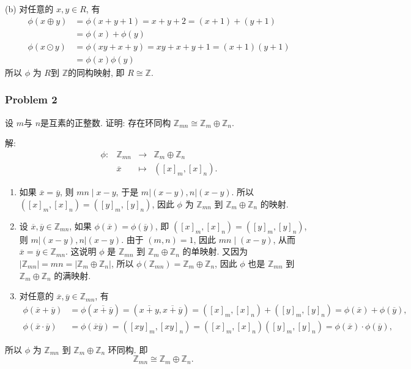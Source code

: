 \documentclass[a4paper,12pt]{ctexart}
\newcommand{\Z}{\mathbb{Z}}
\begin{document}
\begin{enumerate}[label=(\arabic{*})]
      (b) 对任意的 $x, y \in R$, 有
      $$
      \begin{aligned}
      \phi(x \oplus y) &=\phi(x+y+1)=x+y+2=(x+1)+(y+1) \\
      &=\phi(x)+\phi(y) \\
      \phi(x \odot y) &=\phi(x y+x+y)=x y+x+y+1=(x+1)(y+1) \\
      &=\phi(x) \phi(y)
      \end{aligned}
      $$
      所以 $ \phi $ 为 $ R $到 $ \Z $的同构映射, 即 $ R\cong \Z $.
    \end{enumerate}
    \subsubsection*{Problem 2} 
    设 $ m $与 $ n $是互素的正整数. 证明: 存在环同构 $ \Z_{mn}\cong \Z_m\oplus\Z_n $.
    
    解: 
    $$
    \begin{array}{crcl}
    \phi: & \Z_{m n} & \longrightarrow &\Z_m \oplus \Z_n \\
    &\overline{x} & \longmapsto&([x]_m, [x]_n) .
    \end{array}
    $$
    \begin{enumerate}[label=(\arabic{*})]
      \item 如果 $\overline{x}=\overline{y}$, 则 $m n \mid x-y$, 于是 $m|(x-y), n|(x-y)$. 所以 $([x]_m, [x]_n)=([y]_m, [y]_n)$, 因此 $\phi$ 为 $\Z_{m n}$ 到 $\Z_m \oplus \Z_n$ 的映射.
      \item 设 $\overline{x}, \overline{y} \in \Z_{m n}$, 如果 $\phi(\overline{x})=\phi(\overline{y})$, 即 $([x]_m, [x]_n)=([y]_m, [y]_n)$, 则 $m|(x-y), n|(x-y)$. 由于 $(m, n)=1$, 因此 $m n \mid(x-y)$, 从而 $\overline{x}=\overline{y} \in \Z_{m n}$. 这说明 $\phi$ 是 $\Z_{m n}$ 到 $\Z_m \oplus \Z_n$ 的单映射. 又因为 $\left|\Z_{m n}\right|=m n=\left|\Z_m \oplus \Z_n\right|$, 所以 $\phi\left(\Z_{m n}\right)=\Z_m \oplus \Z_n$, 因此 $\phi$ 也是 $\Z_{m n}$ 到 $\Z_m \oplus \Z_n$ 的满映射.
      \item 对任意的 $\overline{x}, \overline{y} \in \Z_{m n}$, 有
      $$
      \begin{aligned}
        \phi(\overline{x}+\overline{y}) &=\phi(\overline{x+\overline{y}})=(\overline{x+y}, \overline{x+\overline{y}})=([x]_m, [x]_n)+([y]_m, [y]_n)=\phi(\overline{x})+\phi(\overline{y}), \\
        \phi(\overline{x} \cdot \overline{y}) &=\phi(\overline{x} \overline{y})=([xy]_m, [xy]_n)=([x]_m, [x]_n)([y]_m, [y]_n)=\phi(\overline{x}) \cdot \phi(\overline{y}),
      \end{aligned}
      $$
\end{enumerate}
    所以 $\phi$ 为 $\Z_{m n}$ 到 $\Z_m \oplus \Z_n$ 环同构. 即
    $$
    \quad \Z_{m n} \cong \Z_m \oplus \Z_n .
    $$
\end{document}

